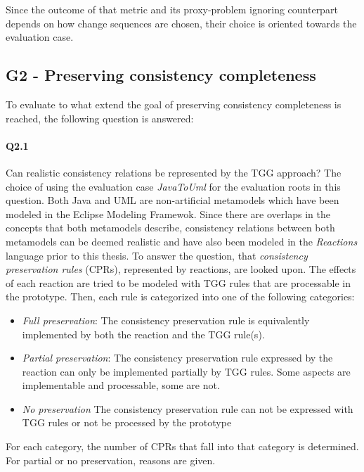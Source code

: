 Since the outcome of that metric and its proxy-problem ignoring counterpart depends on how change sequences are chosen, their choice is oriented towards the evaluation case.



\subsection{G2 - Preserving consistency completeness}
\label{sec:Evaluation:Design:G2}
To evaluate to what extend the goal of preserving consistency completeness is reached, the following question is answered:

\paragraph{Q2.1} Can realistic consistency relations be represented by the TGG approach? \newline
The choice of using the evaluation case \emph{JavaToUml} for the evaluation roots in this question. Both Java and UML are non-artificial metamodels which have been modeled in the Eclipse Modeling Framewok. Since there are overlaps in the concepts that both metamodels describe, consistency relations between both metamodels can be deemed realistic and have also been modeled in the \emph{Reactions} language \cite{kramer_specification_2017} prior to this thesis.
To answer the question, that \emph{consistency preservation rules} (CPRs), represented by reactions, are looked upon. 
The effects of each reaction are tried to be modeled with TGG rules that are processable in the prototype.
Then, each rule is categorized into one of the following categories:
\begin{itemize}
    \item \emph{Full preservation}: The consistency preservation rule is equivalently implemented by both the reaction and the TGG rule(s).
    \item \emph{Partial preservation}: The consistency preservation rule expressed by the reaction can only be implemented partially by TGG rules. Some aspects are implementable and processable, some are not.
    \item \emph{No preservation} The consistency preservation rule can not be expressed with TGG rules or not be processed by the prototype
\end{itemize}
For each category, the number of CPRs that fall into that category is determined. For partial or no preservation, reasons are given.


